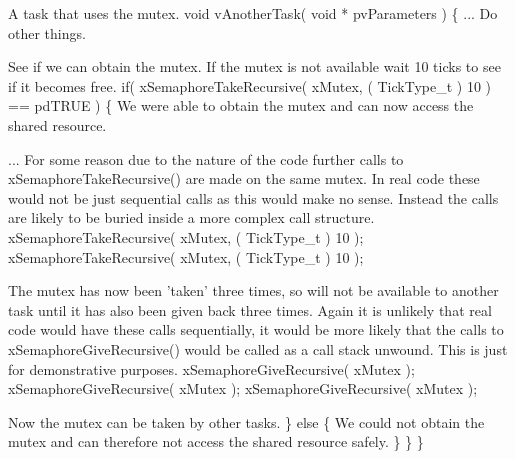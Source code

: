 \begin{DoxyPre}A task that uses the mutex.
 void vAnotherTask( void * pvParameters )
 \{
... Do other things.
\begin{DoxyVerb}if( xMutex != NULL )
{
\end{DoxyVerb}

See if we can obtain the mutex.  If the mutex is not available
wait 10 ticks to see if it becomes free.
        if( xSemaphoreTakeRecursive( xMutex, ( TickType\_t ) 10 ) == pdTRUE )
        \{
We were able to obtain the mutex and can now access the
shared resource.\end{DoxyPre}



\begin{DoxyPre}...
For some reason due to the nature of the code further calls to
xSemaphoreTakeRecursive() are made on the same mutex.  In real
code these would not be just sequential calls as this would make
no sense.  Instead the calls are likely to be buried inside
a more complex call structure.
            xSemaphoreTakeRecursive( xMutex, ( TickType\_t ) 10 );
            xSemaphoreTakeRecursive( xMutex, ( TickType\_t ) 10 );\end{DoxyPre}



\begin{DoxyPre}The mutex has now been 'taken' three times, so will not be
available to another task until it has also been given back
three times.  Again it is unlikely that real code would have
these calls sequentially, it would be more likely that the calls
to xSemaphoreGiveRecursive() would be called as a call stack
unwound.  This is just for demonstrative purposes.
            xSemaphoreGiveRecursive( xMutex );
            xSemaphoreGiveRecursive( xMutex );
            xSemaphoreGiveRecursive( xMutex );\end{DoxyPre}



\begin{DoxyPre}Now the mutex can be taken by other tasks.
        \}
        else
        \{
We could not obtain the mutex and can therefore not access
the shared resource safely.
        \}
    \}
 \}
 \end{DoxyPre}
 